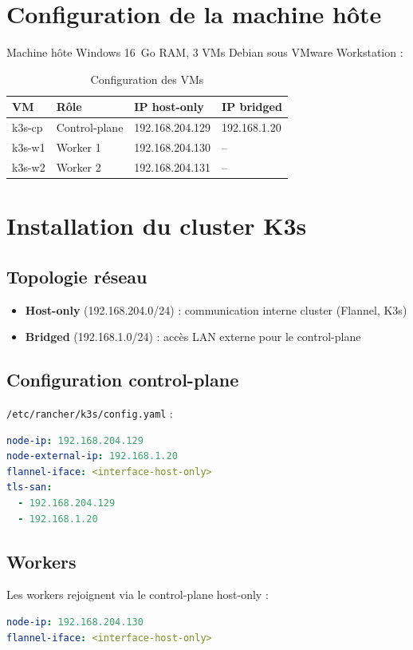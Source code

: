 \documentclass[12pt,a4paper]{report}
\begin{document}
\section{Configuration de la machine hôte}

Machine hôte Windows 16~Go RAM, 3 VMs Debian sous VMware Workstation :

\begin{table}[h]
\centering
\begin{tabular}{|l|l|l|l|}
\hline
\textbf{VM} & \textbf{Rôle} & \textbf{IP host-only} & \textbf{IP bridged} \\
\hline
k3s-cp & Control-plane & 192.168.204.129 & 192.168.1.20 \\
k3s-w1 & Worker 1 & 192.168.204.130 & -- \\
k3s-w2 & Worker 2 & 192.168.204.131 & -- \\
\hline
\end{tabular}
\caption{Configuration des VMs}
\end{table}

\section{Installation du cluster K3s}

\subsection{Topologie réseau}
\begin{itemize}
\item \textbf{Host-only} (192.168.204.0/24) : communication interne cluster (Flannel, K3s)
\item \textbf{Bridged} (192.168.1.0/24) : accès LAN externe pour le control-plane
\end{itemize}

\subsection{Configuration control-plane}
\texttt{/etc/rancher/k3s/config.yaml} :
\begin{lstlisting}[language=yaml]
node-ip: 192.168.204.129
node-external-ip: 192.168.1.20
flannel-iface: <interface-host-only>
tls-san:
  - 192.168.204.129
  - 192.168.1.20
\end{lstlisting}

\subsection{Workers}
Les workers rejoignent via le control-plane host-only :
\begin{lstlisting}[language=yaml]
node-ip: 192.168.204.130
flannel-iface: <interface-host-only>
\end{lstlisting}
\end{document}
